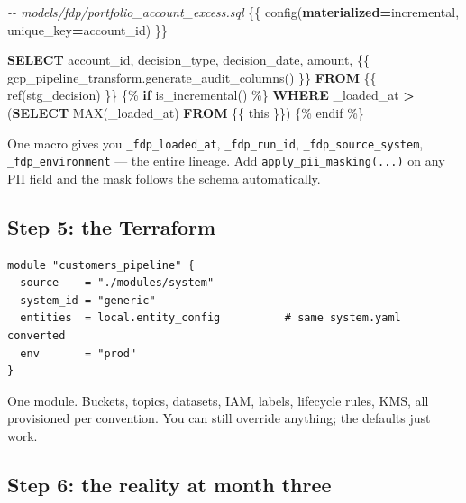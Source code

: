 \documentclass[
  11pt,
  british,
  oneside]{book}
\newenvironment{Shaded}{\begin{snugshade}}{\end{snugshade}}
\newcommand{\CommentTok}[1]{\textcolor[rgb]{0.56,0.35,0.01}{\textit{#1}}}
\newcommand{\ControlFlowTok}[1]{\textcolor[rgb]{0.13,0.29,0.53}{\textbf{#1}}}
\newcommand{\FunctionTok}[1]{\textcolor[rgb]{0.00,0.00,0.00}{#1}}
\newcommand{\KeywordTok}[1]{\textcolor[rgb]{0.13,0.29,0.53}{\textbf{#1}}}
\newcommand{\NormalTok}[1]{#1}
\newcommand{\OperatorTok}[1]{\textcolor[rgb]{0.81,0.36,0.00}{\textbf{#1}}}
\newcommand{\StringTok}[1]{\textcolor[rgb]{0.31,0.60,0.02}{#1}}
\begin{document}
\begin{Shaded}
\begin{Highlighting}[]
\CommentTok{{-}{-} models/fdp/portfolio\_account\_excess.sql}
\NormalTok{\{\{ config(}\KeywordTok{materialized}\OperatorTok{=}\StringTok{\textquotesingle{}incremental\textquotesingle{}}\NormalTok{, unique\_key}\OperatorTok{=}\StringTok{\textquotesingle{}account\_id\textquotesingle{}}\NormalTok{) \}\}}

\KeywordTok{SELECT}
\NormalTok{    account\_id, decision\_type, decision\_date, amount,}
\NormalTok{    \{\{ gcp\_pipeline\_transform.generate\_audit\_columns() \}\}}
\KeywordTok{FROM}\NormalTok{ \{\{ }\FunctionTok{ref}\NormalTok{(}\StringTok{\textquotesingle{}stg\_decision\textquotesingle{}}\NormalTok{) \}\}}
\NormalTok{\{\% }\ControlFlowTok{if}\NormalTok{ is\_incremental() \%\}}
\KeywordTok{WHERE}\NormalTok{ \_loaded\_at }\OperatorTok{\textgreater{}}\NormalTok{ (}\KeywordTok{SELECT} \FunctionTok{MAX}\NormalTok{(\_loaded\_at) }\KeywordTok{FROM}\NormalTok{ \{\{ this \}\})}
\NormalTok{\{\% endif \%\}}
\end{Highlighting}
\end{Shaded}

One macro gives you \texttt{\_fdp\_loaded\_at}, \texttt{\_fdp\_run\_id},
\texttt{\_fdp\_source\_system}, \texttt{\_fdp\_environment} --- the
entire lineage. Add \texttt{apply\_pii\_masking(...)} on any PII field
and the mask follows the schema automatically.

\hypertarget{step-5-the-terraform}{%
\subsection{Step 5: the Terraform}\label{step-5-the-terraform}}

\begin{verbatim}
module "customers_pipeline" {
  source    = "./modules/system"
  system_id = "generic"
  entities  = local.entity_config          # same system.yaml converted
  env       = "prod"
}
\end{verbatim}

One module. Buckets, topics, datasets, IAM, labels, lifecycle rules,
KMS, all provisioned per convention. You can still override anything;
the defaults just work.

\hypertarget{step-6-the-reality-at-month-three}{%
\subsection{Step 6: the reality at month
three}\label{step-6-the-reality-at-month-three}}
\end{document}
